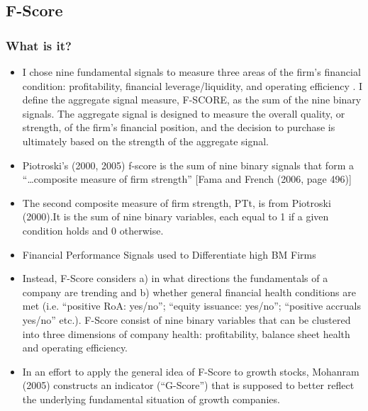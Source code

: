 \documentclass[12pt]{article}
\begin{document}
\subsection{F-Score}

    \subsubsection{What is it?}

        \begin{itemize}

            \item I chose nine fundamental signals to measure three areas of the firm's financial condition: profitability, financial leverage/liquidity, and operating efficiency \citep{Piotroski2000}. I define the aggregate signal measure, F-SCORE, as the sum of the nine binary signals. The aggregate signal is designed to measure the overall quality, or strength, of the firm's financial position, and the decision to purchase is ultimately based on the strength of the aggregate signal.

            \item Piotroski’s (2000, 2005) f-score is the sum of nine binary signals that form a “…composite measure of firm strength” [Fama and French (2006, page 496)] \citep{Choi2012}

            \item The second composite measure of firm strength, PTt, is from Piotroski (2000).It is the sum of nine binary variables, each equal to 1 if a given condition holds and 0 otherwise.\citep{Fama2006}

            \item Financial Performance Signals used to Differentiate high BM Firms \citep{Piotroski2000}

            \item Instead, F-Score considers a) in what directions the fundamentals of a company are trending and b) whether general financial health conditions are met (i.e. “positive RoA: yes/no”; “equity issuance: yes/no”; “positive accruals yes/no” etc.). F-Score consist of nine binary variables that can be clustered into three dimensions of company health: profitability, balance sheet health and operating efficiency.\citep{Mohr2012}
        
            \item In an effort to apply the general idea of F-Score to growth stocks, Mohanram (2005) constructs an indicator (“G-Score”) that is supposed to better reflect the underlying fundamental situation of growth companies. \citep{Mohr2012}


\end{itemize}
\end{document}
